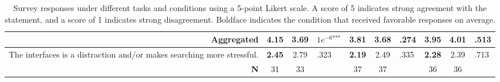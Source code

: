 \begin{table*}[h]
\begin{tabular}{r | c c l | c c l | c c l}
        \hline
        
        \multicolumn{1}{r|}{\textbf{Aggregated}} &
        4.15 & 3.69 & $1e^{-6\textbf{***}}$ &
        \textbf{3.81} & 3.68 & .274 &
        3.95 & \textbf{4.01} & .513 \\
        
        \hline
        
        \multicolumn{1}{p{0.65\columnwidth}|}{The interfaces is a distraction and/or makes searching more stressful.} &
        \textbf{2.45} & 2.79 & .323 &
        \textbf{2.19} & 2.49 & .335 &
        \textbf{2.28} & 2.39 & .713 \\
        \hline
        
        \textbf{N} & 31 & 33 & & 37 & 37 & & 36 & 36 & \\
        
        \hline
        
    \end{tabular}
    \caption{Survey responses under different tasks and conditions using a 5-point Likert scale. A score of 5 indicates strong agreement with the statement, and a score of 1 indicates strong disagreement. Boldface indicates the condition that received favorable responses on average.}
    \label{tab:survey}
\end{table*}

